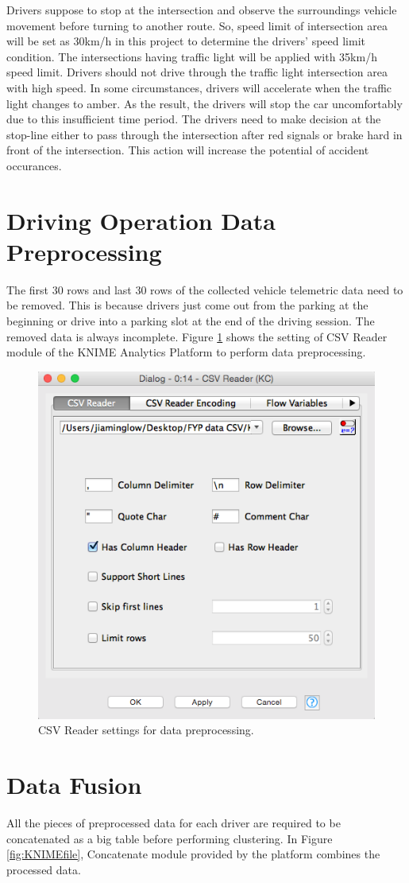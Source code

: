 Drivers suppose to stop at the intersection and observe the surroundings vehicle movement before turning to another route. So, speed limit of intersection area will be set as 30km/h in this project to determine the drivers' speed limit condition. The intersections having traffic light will be applied with 35km/h speed limit. Drivers should not drive through the traffic light intersection area with high speed. In some circumstances, drivers will accelerate when the traffic light changes to amber. As the result, the drivers will stop the car uncomfortably due to this insufficient time period. The drivers need to make decision at the stop-line either to pass through the intersection after red signals or brake hard in front of the intersection. This action will increase the potential of accident occurances.\cite{kulanthayan:phang:hayati:2007}

\section{Driving Operation Data Preprocessing}
The first 30 rows and last 30 rows of the collected vehicle telemetric data need to be removed. This is because drivers just come out from the parking at the beginning or drive into a parking slot at the end of the driving session. The removed data is always incomplete. Figure \ref{fig:preprocess} shows the setting of CSV Reader module of the KNIME Analytics Platform to perform data preprocessing.

\begin{figure}[hbt!]\centering
\includegraphics[height=.5\textwidth]{image/datapreprocessing}
\caption{CSV Reader settings for data preprocessing.}
\label{fig:preprocess}
\end{figure}

\section{Data Fusion}
All the pieces of preprocessed data for each driver are required to be concatenated as a big table before performing clustering. In Figure \ref{fig:KNIMEfile}, Concatenate module provided by the platform combines the processed data.

